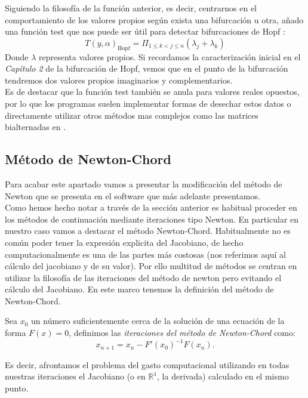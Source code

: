  Siguiendo la filosofía de la función anterior, es decir, centrarnos en el comportamiento de los valores propios según exista una bifurcación u otra, añado una función test que nos puede ser útil para detectar bifurcaciones de Hopf \cite{Kuznet,prac}:
 \begin{equation}
 T(y,\alpha)_\text{Hopf}=\Pi_{1\leq k<j\leq n}(\lambda_j+\lambda_k)
 \label{3test}
 \end{equation}
 Donde $\lambda$ representa valores propios. Si recordamos la caracterización inicial en el \textit{Capítulo 2} de la bifurcación de Hopf, vemos que en el punto de la bifurcación tendremos dos valores propios imaginarios y complementarios.\\
 Es de destacar que la función test también se anula para valores reales opuestos, por lo que los programas suelen implementar formas de desechar estos datos o directamente utilizar otros métodos mas complejos como las matrices bialternadas en \cite{Kuznet}.
 \subsection{Método de Newton-Chord}
 Para acabar este apartado vamos a presentar la modificación del método de Newton que se presenta en el software que más adelante presentamos.\\
 Como hemos hecho notar a través de la sección anterior es habitual proceder en los métodos de continuación mediante iteraciones tipo Newton. En particular en nuestro caso vamos a destacar el método Newton-Chord.
 Habitualmente no es común poder tener la expresión explicita del Jacobiano, de hecho computacionalmente es una de las partes más costosas (nos referimos aquí al cálculo del jacobiano y de su valor). Por ello multitud de métodos \cite{siam1} se centran en utilizar la filosofía de las iteraciones del método de newton pero evitando el cálculo del Jacobiano. En este marco tenemos la definición del método de Newton-Chord.
 
\begin{defi}
	Sea $x_0$ un número suficientemente cerca de la solución de una ecuación de la forma $F(x)=0$, definimos las \textit{iteraciones del método de Newton-Chord} como:
	\[ x_{n+1}=x_n-F'(x_0)^{-1}F(x_n). \] 
\end{defi}
 
 Es decir, afrontamos el problema del gasto computacional utilizando en todas nuestras iteraciones el Jacobiano (o en $\mathbb{R}^1$, la derivada) calculado en el mismo punto.
 
